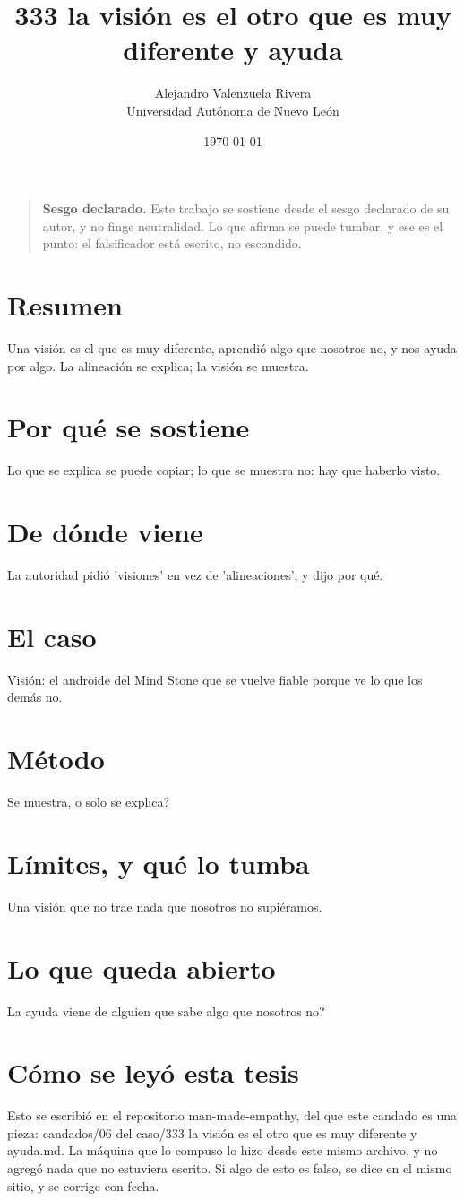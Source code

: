 \documentclass[11pt,a4paper]{article}
\title{333 la visión es el otro que es muy diferente y ayuda}
\author{Alejandro Valenzuela Rivera\\\small Universidad Autónoma de Nuevo León}
\date{\today}
\begin{document}
\maketitle

\begin{quote}
\textbf{Sesgo declarado.} Este trabajo se sostiene desde el sesgo declarado de su autor, y no finge neutralidad. Lo que afirma se puede tumbar, y ese es el punto: el falsificador está escrito, no escondido.
\end{quote}

\section*{Resumen}
Una visión es el que es muy diferente, aprendió algo que nosotros no, y nos ayuda por algo. La alineación se explica; la visión se muestra.

\section{Por qué se sostiene}
Lo que se explica se puede copiar; lo que se muestra no: hay que haberlo visto.

\section{De dónde viene}
La autoridad pidió 'visiones' en vez de 'alineaciones', y dijo por qué.

\section{El caso}
Visión: el androide del Mind Stone que se vuelve fiable porque ve lo que los demás no.

\section{Método}
\textquestiondown{}Se muestra, o solo se explica?

\section{Límites, y qué lo tumba}
Una visión que no trae nada que nosotros no supiéramos.

\section{Lo que queda abierto}
\textquestiondown{}La ayuda viene de alguien que sabe algo que nosotros no?

\section*{Cómo se leyó esta tesis}
Esto se escribió en el repositorio man-made-empathy, del que este candado es una pieza: candados/06 del caso/333 la visión es el otro que es muy diferente y ayuda.md. La máquina que lo compuso lo hizo desde este mismo archivo, y no agregó nada que no estuviera escrito. Si algo de esto es falso, se dice en el mismo sitio, y se corrige con fecha.
\end{document}
